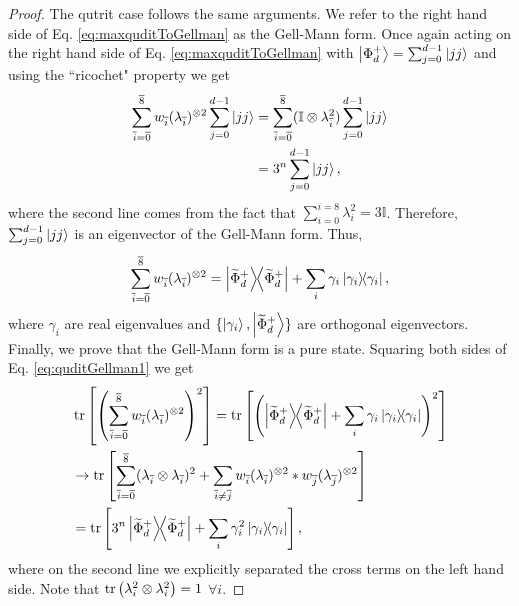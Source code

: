 \documentclass[12pt]{iopart}
\begin{document}
\begin{proof}
    The qutrit case follows the same arguments. We refer to the right hand side of Eq. \eqref{eq:maxquditToGellman} as the Gell-Mann form. Once again acting on the right hand side of Eq. \eqref{eq:maxquditToGellman} with $\ket{\Phi_d^+}=\sum_{j=0}^{d-1}\ket{jj}$ and using the ``ricochet" property we get
    \begin{align}
       \notag\sum_{\overline{i}=\overline 0}^{\overline 8}w_{\overline i}(\lambda_{\overline{i}})^{\otimes 2}\sum_{j=0}^{d-1}\ket{jj}&=\sum_{\overline{i}=\overline 0}^{\overline 8}(\mathbb{I}\otimes\lambda_{\overline{i}}^2)\sum_{j=0}^{d-1}\ket{jj}\\
       &=3^n\sum_{j=0}^{d-1}\ket{jj}, 
    \end{align}
    where the second line comes from the fact that $\sum_{i=0}^{i=8}\lambda_i^2=3\mathbb{I}$. Therefore, $\sum_{j=0}^{d-1}\ket{jj}$ is an eigenvector of the Gell-Mann form. Thus,
    \begin{align}\label{eq:quditGellman1}
        \sum_{\overline{i}=\overline 0}^{\overline 8}w_{\overline i}(\lambda_{\overline{i}})^{\otimes 2}=\op{\widetilde\Phi_d^+}+\sum_i\gamma_i\op{\gamma_i},
    \end{align}
    where $\gamma_i$ are real eigenvalues and $\{\ket{\gamma_i},\ket{\widetilde\Phi^+_d}\}$ are orthogonal eigenvectors. Finally, we prove that the Gell-Mann form is a pure state. Squaring both sides of Eq. \eqref{eq:quditGellman1} we get
    \begin{align}\label{eq:quditGellman2}
        \notag&\tr\left[\left(\sum_{\overline{i}=\overline 0}^{\overline 8}w_{\overline i}(\lambda_{\overline{i}})^{\otimes 2}\right)^2\right]=\tr\left[\left(\op{\widetilde\Phi_d^+}+\sum_i\gamma_i\op{\gamma_i}\right)^2\right]\\
        \notag&\rightarrow\tr\left[\sum_{\overline{i}=\overline 0}^{\overline 8}(\lambda_{\overline{i}}\otimes \lambda_{\overline{i}})^2+\sum_{\overline{i}\neq \overline{j}}w_{\overline i}(\lambda_{\overline{i}})^{\otimes 2}*w_{\overline j}(\lambda_{\overline{j}})^{\otimes 2}\right]\\
        &=\tr\left[3^{n}\op{\widetilde\Phi_d^+}+\sum_i\gamma_i^2\op{\gamma_i}\right],
    \end{align}
    where on the second line we explicitly separated the cross terms on the left hand side. Note that $\tr\left(\lambda_i^2\otimes\lambda_i^2\right)=1$ $\forall i.$
    

\end{proof}
\end{document}
